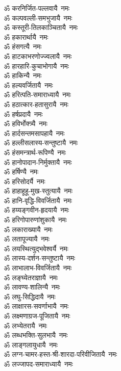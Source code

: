 \begin{multicols}{2}
\begin{flushleft}
ॐ करनिर्जित-पल्लवायै~नमः\\
ॐ कल्पवल्ली-समभुजायै~नमः\\
ॐ कस्तूरी-तिलकाञ्चितायै~नमः\hfill {}\\
ॐ हकारार्थायै~नमः\\
ॐ हंसगत्यै~नमः\\
ॐ हाटकाभरणोज्ज्वलायै~नमः\\
ॐ हारहारि-कुचाभोगायै~नमः\\
ॐ हाकिन्यै~नमः\\
ॐ हल्यवर्जितायै~नमः\\
ॐ हरित्पति-समाराध्यायै~नमः\\
ॐ हठात्कार-हतासुरायै~नमः\\
ॐ हर्षप्रदायै~नमः\\
ॐ हविर्भोक्त्र्यै~नमः\hfill {}\\
ॐ हार्दसन्तमसापहायै~नमः\\
ॐ हल्लीसलास्य-सन्तुष्टायै~नमः\\
ॐ हंसमन्त्रार्थ-रूपिण्यै~नमः\\
ॐ हानोपादान-निर्मुक्तायै~नमः\\
ॐ हर्षिण्यै~नमः\\
ॐ हरिसोदर्यै~नमः\\
ॐ हाहाहूहू-मुख-स्तुत्यायै~नमः\\
ॐ हानि-वृद्धि-विवर्जितायै~नमः\\
ॐ हय्यङ्गवीन-हृदयायै~नमः\\
ॐ हरिगोपारुणांशुकायै~नमः\hfill {}\\
ॐ लकाराख्यायै~नमः\\
ॐ लतापूज्यायै~नमः\\
ॐ लयस्थित्युद्भवेश्वर्यै~नमः\\
ॐ लास्य-दर्शन-सन्तुष्टायै~नमः\\
ॐ लाभालाभ-विवर्जितायै~नमः\\
ॐ लङ्घ्येतराज्ञायै~नमः\\
ॐ लावण्य-शालिन्यै~नमः\\
ॐ लघु-सिद्धिदायै~नमः\\
ॐ लाक्षारस-सवर्णाभायै~नमः\\
ॐ लक्ष्मणाग्रज-पूजितायै~नमः\hfill {}\\
ॐ लभ्येतरायै~नमः\\
ॐ लब्धभक्ति-सुलभायै~नमः\\
ॐ लाङ्गलायुधायै~नमः\\
ॐ लग्न-चामर-हस्त-श्री-शारदा-परिवीजितायै~नमः\\
ॐ लज्जापद-समाराध्यायै~नमः\\

\end{flushleft}
\end{multicols}
